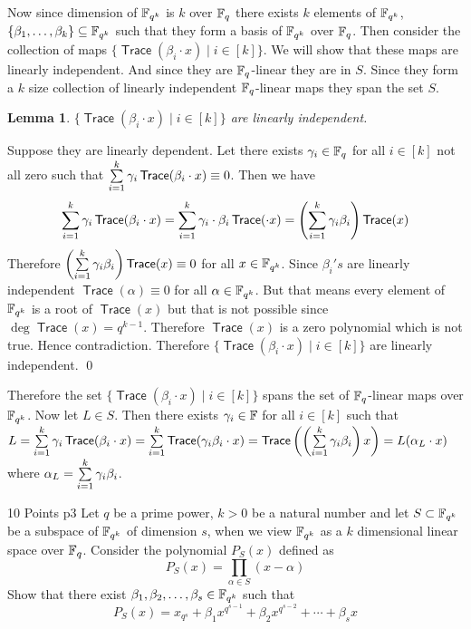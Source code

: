 \documentclass[a4paper, 11pt]{article}
\newtheorem{lemma}{Lemma}
\renewenvironment{proof}{\noindent{\it \textbf{Proof:}}\hspace*{1em}}{\qed\bigskip\\}
\DeclareMathOperator{\trac}{\textsf{Trace}}
\begin{document}
{\begin{enumerate}[label=(\alph*)]
Now since dimension of $\mathbb{F}_{q^k}$ is $k$ over $\mathbb{F}_q$ there exists $k $ elements of $\mathbb{F}_{q^k}$, $\{\beta_1,\dots, \beta_k\}\subseteq \mathbb{F}_{q^k}$ such that they form a basis of $\mathbb{F}_{q^k}$ over $\mathbb{F}_{q}$. Then consider the collection of maps $\{\trac(\beta_i\cdot x)\mid i\in[k]\}$. We will show that these maps are linearly independent. And since they are $\mathbb{F}_q$-linear they are in $S$. Since they form a $k$ size collection of linearly independent $\mathbb{F}_q$-linear maps they span the set $S$.
\begin{lemma}
	$\{\trac(\beta_i\cdot x)\mid i\in[k]\}$ are linearly independent.
\end{lemma}
\begin{proof}
	Suppose they are linearly dependent. Let there exists $\gamma_i\in\mathbb{F}_q$ for all $i\in[k]$ not all zero such that $\sum\limits_{i=1}^k\gm_i\trac(\beta_i\cdot x)\equiv 0$. Then we have $$\sum\limits_{i=1}^k\gm_i\trac(\beta_i\cdot x)=\sum_{i=1}^k\gm_i\cdot\beta_i\trac(\cdot x)=\lt(\sum_{i=1}^k\gm_i\beta_i\rt)\trac(x)$$Therefore $\lt(\sum\limits_{i=1}^k\gm_i\beta_i\rt)\trac(x)\equiv0$ for all $x\in\mathbb{F}_{q^k}$. Since $\beta_i's$ are linearly independent $\trac(\alpha)\equiv 0$ for all $\alpha\in\mathbb{F}_{q^k}$. But that means every element of $\mathbb{F}_{q^k}$ is a root of $\trac(x)$ but that is not possible since $\deg\trac(x)=q^{k-1}$. Therefore $\trac(x)$ is a zero polynomial which is not true. Hence contradiction. Therefore $\{\trac(\beta_i\cdot x)\mid i\in[k]\}$ are linearly independent.
\end{proof}

Therefore the set $\{\trac(\beta_i\cdot x)\mid i\in[k]\}$ spans the set of $\mathbb{F}_q$-linear maps over $\mathbb{F}_{q^k}$. Now let $L\in S$. Then there exists $\gamma_i\in\mathbb{F}$ for all $i\in[k]$ such that $L=\sum\limits_{i=1}^k \gm_i\trac(\beta_i\cdot x)=\sum\limits_{i=1}^k \trac(\gm_i\beta_i\cdot x)=\trac\lt(\lt(\sum\limits_{i=1}^k \gm_i\beta_i\rt)x\rt)=L(\alpha_L\cdot x)$ where $\alpha_L=\sum\limits_{i=1}^k \gamma_i\beta_i$.
\end{enumerate}
}


\begin{problem}{%
		\hfill 10 Points
	}{p3%
	}
Let $q$ be a prime power, $k>0$ be a natural number and let $S\subset \mathbb{F}_{q^k}$ be a subspace of $\mathbb{F}_{q^k}$ of dimension $s$, when we view $\mathbb{F}_{q^k}$ as a $k$ dimensional linear space over $\mathbb{F}_q$. Consider the polynomial $P_S(x)$ defined as $$P_S(x)=\prod_{\alpha\in S}(x-\alpha )$$Show that there exist $\beta_1,\beta_2,\dots, \beta_s\in\mathbb{F}_{q^k}$ such that $$P_S(x)=x_{q^s}+\beta_1x^{q^{s-1}}+\beta_2x^{q^{s-2}}+\cdots +\beta_sx$$

\end{problem}
\solve{

}
\newpage
\end{document}
